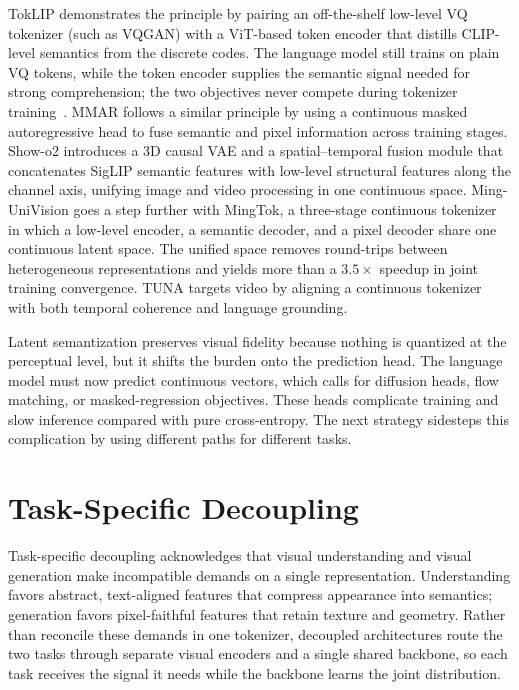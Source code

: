 \documentclass[manuscript,screen,review]{acmart}
\begin{document}
TokLIP demonstrates the principle by pairing an off-the-shelf
low-level VQ tokenizer (such as VQGAN) with a ViT-based token encoder
that distills CLIP-level semantics from the discrete codes. The
language model still trains on plain VQ tokens, while the token encoder
supplies the semantic signal needed for strong comprehension; the two
objectives never compete during tokenizer training~\cite{lin2025toklip}.
MMAR follows a similar principle by using a continuous masked
autoregressive head to fuse semantic and pixel information across
training stages. Show-o2 introduces a 3D causal VAE and a
spatial--temporal fusion module that concatenates SigLIP semantic
features with low-level structural features along the channel axis,
unifying image and video processing in one continuous space.
Ming-UniVision goes a step further with MingTok, a three-stage
continuous tokenizer in which a low-level encoder, a semantic decoder,
and a pixel decoder share one continuous latent space. The unified
space removes round-trips between heterogeneous representations and
yields more than a $3.5\times$ speedup in joint training convergence.
TUNA targets video by aligning a continuous tokenizer with both
temporal coherence and language grounding.

Latent semantization preserves visual fidelity because nothing is
quantized at the perceptual level, but it shifts the burden onto the
prediction head. The language model must now predict continuous
vectors, which calls for diffusion heads, flow matching, or
masked-regression objectives. These heads complicate training and
slow inference compared with pure cross-entropy. The next strategy
sidesteps this complication by using different paths for different
tasks.

\section{Task-Specific Decoupling}

Task-specific decoupling acknowledges that visual understanding and
visual generation make incompatible demands on a single representation.
Understanding favors abstract, text-aligned features that compress
appearance into semantics; generation favors pixel-faithful features
that retain texture and geometry. Rather than reconcile these demands
in one tokenizer, decoupled architectures route the two tasks through
separate visual encoders and a single shared backbone, so each task
receives the signal it needs while the backbone learns the joint
distribution.
\end{document}
